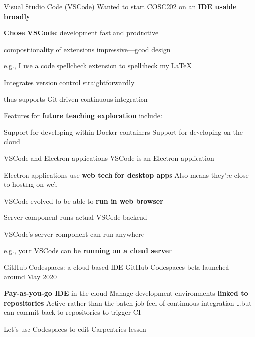 \documentclass[aspectratio=169,t]{beamer}
\begin{document}
\begin{dframe}{Visual Studio Code (VSCode)}
  \1 Wanted to start COSC202 on an \textbf{IDE usable broadly}

  \smallskip

  \1 \textbf{Chose VSCode}: development fast and productive
  
  \2 compositionality of extensions impressive---good design
  
  \3 e.g., I use a code spellcheck extension to spellcheck my \LaTeX{}

  \2 Integrates version control straightforwardly
  
  \3 thus supports Git-driven continuous integration

  \smallskip

  \1 Features for \textbf{future teaching exploration} include:

  \2 Support for developing within Docker containers
  \2 Support for developing on the cloud
\end{dframe}

\begin{dframe}{VSCode and Electron applications}
  \1 VSCode is an Electron application

  \2 Electron applications use \textbf{web tech for desktop apps}
  \2 Also means they're close to hosting on web

  \bigskip

  \1 VSCode evolved to be able to \textbf{run in web browser}

  \2 Server component runs actual VSCode backend
    
  \bigskip

  \1 VSCode's server component can run anywhere

  \2 e.g., your VSCode can be \textbf{running on a cloud server}

\end{dframe}

\begin{dframe}{GitHub Codespaces: a cloud-based IDE}
  \1 GitHub Codespaces beta launched around May 2020

  \2 \textbf{Pay-as-you-go IDE} in the cloud
  \2 Manage development environments \textbf{linked to repositories}
  \2 Active rather than the batch job feel of continuous integration
  \2 \dots but can commit back to repositories to trigger CI

  \bigskip

  \1 Let's use Codespaces to edit Carpentries lesson
\end{dframe}
\end{document}
